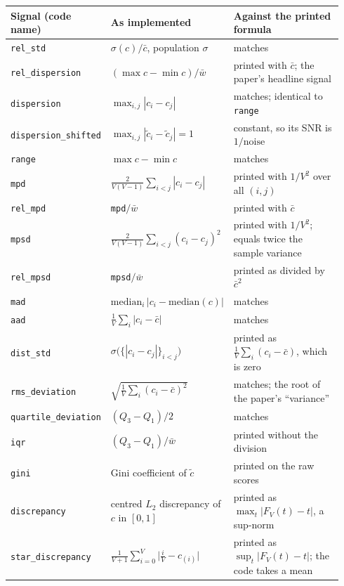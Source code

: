 \begin{table}[h]
\centering
\scriptsize
\begin{tabular}{@{}p{0.19\linewidth}p{0.36\linewidth}p{0.39\linewidth}@{}}
\toprule
\textbf{Signal (code name)} & \textbf{As implemented} & \textbf{Against the printed formula} \\
\midrule
\texttt{rel\_std} & $\sigma(c)/\bar{c}$, population $\sigma$ & matches \\
\texttt{rel\_dispersion} & $(\max c - \min c)/\bar{w}$ & printed with $\bar{c}$; the paper's headline signal \\
\texttt{dispersion} & $\max_{i,j}|c_i - c_j|$ & matches; identical to \texttt{range} \\
\texttt{dispersion\_shifted} & $\max_{i,j}|\tilde{c}_i - \tilde{c}_j| = 1$ & constant, so its SNR is $1/\text{noise}$ \\
\texttt{range} & $\max c - \min c$ & matches \\
\texttt{mpd} & $\frac{2}{V(V-1)}\sum_{i<j}|c_i - c_j|$ & printed with $1/V^2$ over all $(i,j)$ \\
\texttt{rel\_mpd} & \texttt{mpd}$/\bar{w}$ & printed with $\bar{c}$ \\
\texttt{mpsd} & $\frac{2}{V(V-1)}\sum_{i<j}(c_i - c_j)^2$ & printed with $1/V^2$; equals twice the sample variance \\
\texttt{rel\_mpsd} & \texttt{mpsd}$/\bar{w}$ & printed as divided by $\bar{c}^2$ \\
\texttt{mad} & $\mathrm{median}_i\,|c_i - \mathrm{median}(c)|$ & matches \\
\texttt{aad} & $\frac{1}{V}\sum_i |c_i - \bar{c}|$ & matches \\
\texttt{dist\_std} & $\sigma\big(\{|c_i - c_j|\}_{i<j}\big)$ & printed as $\frac{1}{V}\sum_i (c_i - \bar{c})$, which is zero \\
\texttt{rms\_deviation} & $\sqrt{\frac{1}{V}\sum_i (c_i - \bar{c})^2}$ & matches; the root of the paper's ``variance'' \\
\texttt{quartile\_deviation} & $(Q_3 - Q_1)/2$ & matches \\
\texttt{iqr} & $(Q_3 - Q_1)/\bar{w}$ & printed without the division \\
\texttt{gini} & Gini coefficient of $\tilde{c}$ & printed on the raw scores \\
\texttt{discrepancy} & centred $L_2$ discrepancy of $c$ in $[0,1]$ & printed as $\max_t |F_V(t) - t|$, a sup-norm \\
\texttt{star\_discrepancy} & $\frac{1}{V+1}\sum_{i=0}^{V}\big|\tfrac{i}{V} - c_{(i)}\big|$ & printed as $\sup_t |F_V(t) - t|$; the code takes a mean \\

\end{tabular}
\end{table}
